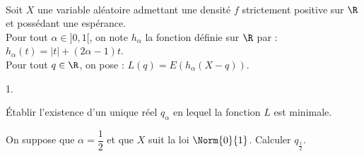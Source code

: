 \documentclass[11pt]{article}%
\begin{document}
\begin{exerciceSP}~\\
  Soit $X$ une variable aléatoire admettant une densité $f$
  strictement positive sur $\R$ et possédant une espérance.\\
  Pour tout $\alpha\in]0,1[$, on note $h_\alpha$ la fonction définie
  sur $\R$ par : $h_\alpha(t)=\vert t \vert + (2\alpha -1)t$.\\
  Pour tout $q\in\R$, on pose : $L(q)=E\left(h_\alpha(X-q)\right)$.
  \begin{noliste}{1.}
    \setlength{\itemsep}{2mm}
  \item Établir l'existence d'un unique réel $q_\alpha$ en lequel la
    fonction $L$ est minimale.
  \item On suppose que $\alpha=\dfrac{1}{2}$ et que $X$ suit la loi
    $\Norm{0}{1}$. Calculer $q_{\frac{1}{2}}$.
  \end{noliste}
\end{exerciceSP}



\newpage
\end{document}
